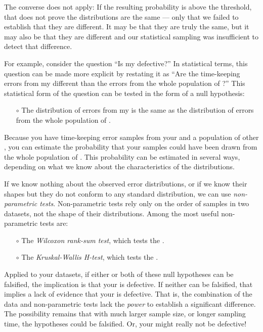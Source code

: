 The converse does not apply: 
If the resulting probability is above the threshold, that does not prove the distributions are the same --- only that we failed to establish that they are different.
It may be that they are truly the same, but it may also be that they are different and our statistical sampling was insufficient to detect that difference.

For example, consider the question ``Is my \rtc defective?'' 
In statistical terms, this question can be made more explicit by restating it as ``Are the time-keeping errors from my \rtc different than the errors from the whole population of \rtcs?''
This statistical form of the question can be tested in the form of a null hypothesis: 
\begin{itemize}
	\item[$\circ$]The distribution of errors from my \rtc is the same as the distribution of errors from the  whole population of \rtcs.
\end{itemize}
Because you have time-keeping error samples from your \rtc and a population of other \rtcs, you can estimate the probability that your samples could have been drawn from the whole population of \rtcs.
This probability can be estimated in several ways, depending on what we know about the characteristics of the distributions. 

If we know nothing about the observed error distributions, or if we know their shapes but they do not conform to any standard distribution, we can use \emph{non-parametric tests}.
Non-parametric tests rely only on the order of samples in two datasets, not the shape of their distributions.
Among the most useful non-parametric tests are:
\begin{itemize}
	\item[$\circ$] The \emph{Wilcoxon rank-sum test}, which tests the . 
	\item[$\circ$] The \emph{Kruskal-Wallis H-test}, which tests the  .
\end{itemize}
Applied to your datasets, if either or both of these null hypotheses can be falsified, the implication is that your \rtc is defective.
If neither can be falsified, that implies a lack of evidence that your \rtc is defective. 
That is, the combination of the data and non-parametric tests lack the \emph{power} to establish a significant difference.
The possibility remains that with much larger sample size, or longer sampling time, the hypotheses could be falsified. 
Or, your \rtc might really not be defective!

